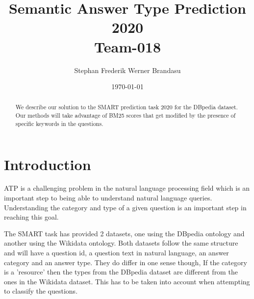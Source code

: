 \documentclass[sigconf]{acmart}
\begin{document}

\title{%
  Semantic Answer Type Prediction 2020 \\
  \large Team-018}

\author{Stephan Frederik Werner Brandasu}

\date{\today}



\begin{abstract}
We describe our solution to the \gls{SMART} prediction task 2020 for the DBpedia dataset. Our methods will take advantage of BM25 scores that get modified by the presence of specific keywords in the questions.
\end{abstract}


\renewcommand\footnotetextcopyrightpermission[1]{}
\pagestyle{plain}

\maketitle



\section{Introduction}
\gls{ATP} is a challenging problem in the natural language processing field which is an important step to being able to understand natural language queries. Understanding the category and type of a given question is an important step in reaching this goal.

The \gls{SMART} task has provided 2 datasets, one using the DBpedia ontology and another using the Wikidata ontology.
Both datasets follow the same structure and will have a question id, a question text in natural language, an answer category and an answer type. They do differ in one sense though, If the category is a 'resource' then the types from the DBpedia dataset are different from the ones in the Wikidata dataset. This has to be taken into account when attempting to classify the questions.
\end{document}
